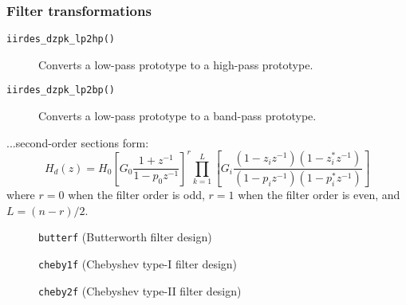 % 
%
\subsubsection{Filter transformations}
\label{module:filter:iirdes:transformations}
\begin{description}
\item[{\tt iirdes\_dzpk\_lp2hp()}]
    Converts a low-pass prototype to a high-pass prototype.
\item[{\tt iirdes\_dzpk\_lp2bp()}]
    Converts a low-pass prototype to a band-pass prototype.
\end{description}

...second-order sections form:
\[
    H_d(z) = H_0
             \left[
                G_0 \frac{1 + z^{-1}}
                         {1 - p_0 z^{-1}}
             \right]^r
             \prod_{k=1}^{L} {\left[
                G_i \frac{(1-z_iz^{-1})(1-z_i^*z^{-1})}
                         {(1-p_iz^{-1})(1-p_i^*z^{-1})}
             \right]}
\]
where $r=0$ when the filter order is odd, $r=1$ when the filter order is even,
and $L=(n-r)/2$.

\begin{figure}
\centering
{}
\caption{{\tt butterf} (Butterworth filter design)}
\label{fig:module:filter:butter}
\end{figure}

\begin{figure}
\centering
{}
\caption{{\tt cheby1f} (Chebyshev type-I filter design)}
\label{fig:module:filter:cheby1}
\end{figure}

\begin{figure}
\centering
{}
\caption{{\tt cheby2f} (Chebyshev type-II filter design)}
\label{fig:module:filter:cheby2}
\end{figure}

